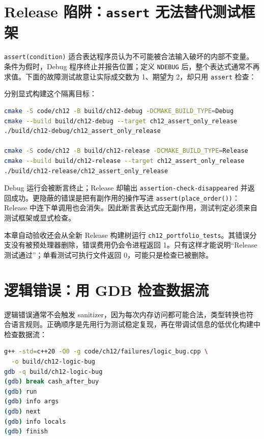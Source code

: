 \section{Release 陷阱：\texttt{assert} 无法替代测试框架}

\texttt{assert(condition)} 适合表达程序员认为不可能被合法输入破坏的内部不变量。条件为假时，Debug 程序终止并报告位置；定义 \texttt{NDEBUG} 后，整个表达式通常不再求值。下面的故障测试故意让实际成交数为 1、期望为 2，却只用 \texttt{assert} 检查：



分别显式构建这个隔离目标：

\begin{lstlisting}[language=bash,numbers=none]
cmake -S code/ch12 -B build/ch12-debug -DCMAKE_BUILD_TYPE=Debug
cmake --build build/ch12-debug --target ch12_assert_only_release
./build/ch12-debug/ch12_assert_only_release

cmake -S code/ch12 -B build/ch12-release -DCMAKE_BUILD_TYPE=Release
cmake --build build/ch12-release --target ch12_assert_only_release
./build/ch12-release/ch12_assert_only_release
\end{lstlisting}

Debug 运行会被断言终止；Release 却输出 \texttt{assertion-check-disappeared} 并返回成功。更隐蔽的错误是把有副作用的操作写进 \texttt{assert(place\_order())}：Release 中连下单调用也会消失。因此断言表达式应无副作用，测试判定必须来自测试框架或显式检查。

本章自动验收还会从全新 Release 构建树运行 \texttt{ch12\_portfolio\_tests}。其错误分支没有被预处理器删除，错误费用仍会令进程返回 1。只有这样才能说明“Release 测试通过”；单看测试可执行文件返回 0，可能只是检查已被删除。

\section{逻辑错误：用 GDB 检查数据流}

逻辑错误通常不会触发 sanitizer，因为每次内存访问都可能合法，类型转换也符合语言规则。正确顺序是先用行为测试稳定复现，再在带调试信息的低优化构建中检查数据流：

\begin{lstlisting}[language=bash,numbers=none]
g++ -std=c++20 -O0 -g code/ch12/failures/logic_bug.cpp \
  -o build/ch12-logic-bug
gdb -q build/ch12-logic-bug
(gdb) break cash_after_buy
(gdb) run
(gdb) info args
(gdb) next
(gdb) info locals
(gdb) finish
\end{lstlisting}

